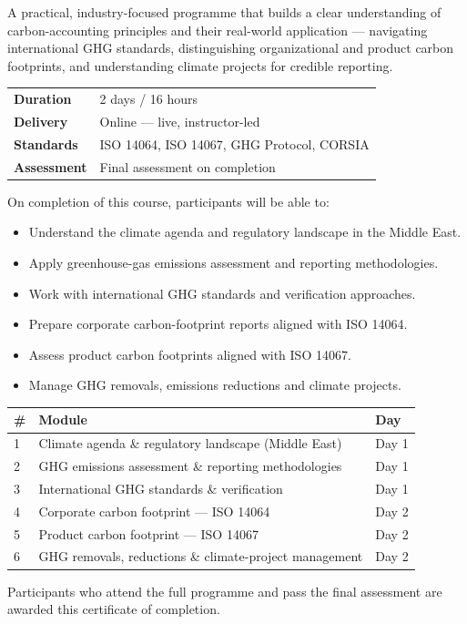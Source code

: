 
A practical, industry-focused programme that builds a clear understanding of
carbon-accounting principles and their real-world application --- navigating
international GHG standards, distinguishing organizational and product carbon
footprints, and understanding climate projects for credible reporting.

\vspace{6pt}
\begin{tabular}{@{}p{3.4cm}p{9cm}@{}}
  \textbf{Duration}   & 2 days / 16 hours \\[2pt]
  \textbf{Delivery}   & Online --- live, instructor-led \\[2pt]
  \textbf{Standards}  & ISO 14064, ISO 14067, GHG Protocol, CORSIA \\[2pt]
  \textbf{Assessment} & Final assessment on completion \\
\end{tabular}

On completion of this course, participants will be able to:
\begin{itemize}\setlength\itemsep{1pt}\setlength\parskip{0pt}
  \item Understand the climate agenda and regulatory landscape in the Middle East.
  \item Apply greenhouse-gas emissions assessment and reporting methodologies.
  \item Work with international GHG standards and verification approaches.
  \item Prepare corporate carbon-footprint reports aligned with ISO 14064.
  \item Assess product carbon footprints aligned with ISO 14067.
  \item Manage GHG removals, emissions reductions and climate projects.
\end{itemize}

\renewcommand{\arraystretch}{1.15}
\begin{tabular}{@{}p{0.9cm}p{9.6cm}p{1.7cm}@{}}
  \textbf{\#} & \textbf{Module} & \textbf{Day} \\[2pt]
  \hline
  1 & Climate agenda \& regulatory landscape (Middle East)        & Day 1 \\
  2 & GHG emissions assessment \& reporting methodologies         & Day 1 \\
  3 & International GHG standards \& verification                 & Day 1 \\
  4 & Corporate carbon footprint --- ISO 14064                    & Day 2 \\
  5 & Product carbon footprint --- ISO 14067                      & Day 2 \\
  6 & GHG removals, reductions \& climate-project management      & Day 2 \\
\end{tabular}

Participants who attend the full programme and pass the final assessment are
awarded this certificate of completion.
